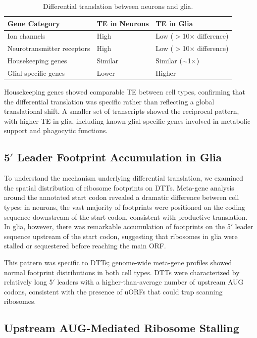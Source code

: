 \documentclass[12pt]{article}
\begin{document}
\begin{table}[ht]
\centering
\caption{Differential translation between neurons and glia.}
\label{tab:dtts}
\begin{tabular}{lll}
\toprule
Gene Category & TE in Neurons & TE in Glia \\
\midrule
Ion channels & High & Low ($>$10$\times$ difference) \\
Neurotransmitter receptors & High & Low ($>$10$\times$ difference) \\
Housekeeping genes & Similar & Similar ($\sim$1$\times$) \\
Glial-specific genes & Lower & Higher \\
\bottomrule
\end{tabular}
\end{table}

Housekeeping genes showed comparable TE between cell types, confirming that the differential translation was specific rather than reflecting a global translational shift. A smaller set of transcripts showed the reciprocal pattern, with higher TE in glia, including known glial-specific genes involved in metabolic support and phagocytic functions.

\subsection{5$'$ Leader Footprint Accumulation in Glia}

To understand the mechanism underlying differential translation, we examined the spatial distribution of ribosome footprints on DTTs. Meta-gene analysis around the annotated start codon revealed a dramatic difference between cell types: in neurons, the vast majority of footprints were positioned on the coding sequence downstream of the start codon, consistent with productive translation. In glia, however, there was remarkable accumulation of footprints on the 5$'$ leader sequence upstream of the start codon, suggesting that ribosomes in glia were stalled or sequestered before reaching the main ORF.

This pattern was specific to DTTs; genome-wide meta-gene profiles showed normal footprint distributions in both cell types. DTTs were characterized by relatively long 5$'$ leaders with a higher-than-average number of upstream AUG codons, consistent with the presence of uORFs that could trap scanning ribosomes.

\subsection{Upstream AUG-Mediated Ribosome Stalling}
\end{document}
